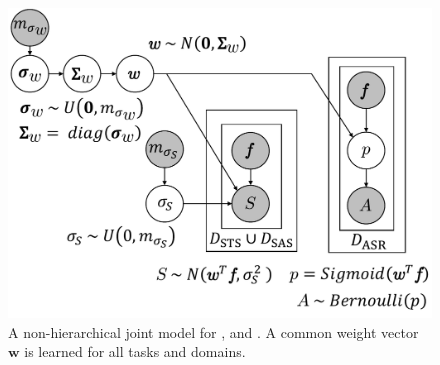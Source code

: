 \begin{figure}[t]
\centering
\includegraphics[scale=0.38]{2016_naacl_stsdomain/figures/sts_sas_qa_model_compact.pdf}
\caption{
A non-hierarchical joint model for \sts{}, \sas{} and \asr{}.
A common weight vector $\boldsymbol{w}$ is learned for all tasks and domains.}
\label{figure:sts-sas-asr-model}
\end{figure}










